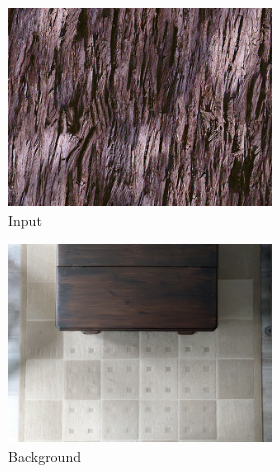 \begin{figure}[]
    \begin{subfigure}{\textwidth}
        \centering
        \begin{subfigure}{0.24\textwidth}
            \centering
            \includegraphics[width=\textwidth]{images/04-experiment02/carpet/wood/target.jpg}
            \caption*{Input}
        \end{subfigure}
        \hfill
        \begin{subfigure}{0.24\textwidth}
            \centering
            \includegraphics[width=\textwidth]{images/04-experiment02/carpet/bg.jpg}
            \caption*{Background}
        \end{subfigure}
        \hfill
        \begin{subfigure}{0.24\textwidth}

\end{subfigure}
\end{subfigure}
\end{figure}
